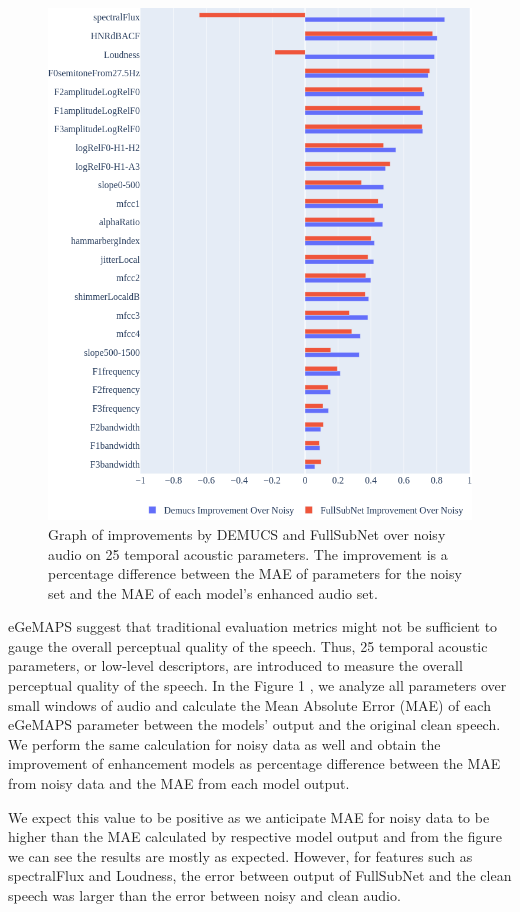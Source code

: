 \documentclass{article}
\begin{document}
\begin{figure}[h]
    \centering
    \includegraphics[width = 0.6 \textwidth]{egemaps_improvement_lowlevel.png}
    \caption{Graph of improvements by DEMUCS and FullSubNet over noisy audio on 25 temporal acoustic parameters. The improvement is a percentage difference between the MAE of parameters for the noisy set and the MAE of each model's enhanced audio set.}
\end{figure}

eGeMAPS suggest that traditional evaluation metrics might not be sufficient to gauge the overall perceptual quality of the speech. Thus, 25 temporal acoustic parameters, or low-level descriptors, are introduced to measure the overall perceptual quality of the speech. In the Figure 1 , we analyze all parameters over small windows of audio and calculate the Mean Absolute Error (MAE) of each eGeMAPS parameter between the models' output and the original clean speech. We perform the same calculation for noisy data as well and obtain the improvement of enhancement models as percentage difference between the MAE from noisy data and the MAE from each model output.

We expect this value to be positive as we anticipate MAE for noisy data to be higher than the MAE calculated by respective model output and from the figure we can see the results are mostly as expected. However, for features such as spectralFlux and Loudness, the error between output of FullSubNet and the clean speech was larger than the error between noisy and clean audio.
\end{document}
